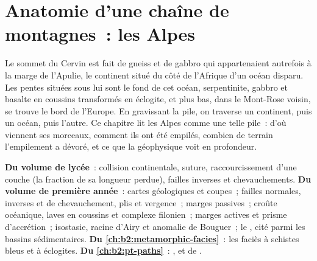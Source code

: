 \chapter{Anatomie d'une chaîne de montagnes~: les Alpes}\label{ch:b2:alpine-orogen}

Le sommet du Cervin est fait de gneiss et de gabbro qui appartenaient autrefois à la marge
de l'Apulie, le continent situé du côté de l'Afrique d'un océan disparu. Les pentes situées
sous lui sont le fond de cet océan, serpentinite, gabbro et basalte en coussins transformés en
éclogite, et plus bas, dans le Mont-Rose voisin, se trouve le bord de l'Europe. En gravissant
la pile, on traverse un continent, puis un océan, puis l'autre. Ce chapitre lit les Alpes comme une telle pile~: d'où viennent ses morceaux, comment ils ont été
empilés, combien de terrain l'empilement a dévoré, et ce que la géophysique voit en profondeur.

\begin{recall}
\textbf{Du volume de lycée}~: collision continentale, suture, raccourcissement d'une
couche (la fraction de sa longueur perdue), failles inverses et chevauchements. \textbf{Du
volume de première année}~: cartes géologiques et coupes~; failles normales, inverses et de chevauchement, plis et
vergence~; marges passives~; croûte océanique, laves en coussins et complexe filonien~;
marges actives et prisme d'accrétion~; isostasie, racine d'Airy et anomalie de Bouguer~;
le , cité parmi les bassins sédimentaires. \textbf{Du
\cref{ch:b2:metamorphic-facies}}~: les faciès à schistes bleus et à éclogites. \textbf{Du
\cref{ch:b2:pt-paths}}~: ,  et  de
.
\end{recall}

